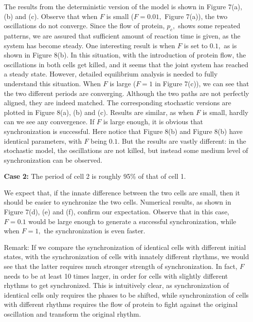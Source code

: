 \documentclass[12pt]{article}
\renewcommand{\(}{\left (}
\renewcommand{\)}{\right )}
\begin{document}
The results from the deterministic version of the model is shown in Figure 7(a), (b) and (c). Observe that when $F$ is small ($F=0.01,$ Figure 7(a)), the two oscillations do not converge. Since the flow of protein, $p_c,$ shows some repeated patterns, we are assured that sufficient amount of reaction time is given, as the system has become steady. One interesting result is when $F$ is set to $0.1,$ as is shown in Figure 8(b). In this situation, with the introduction of protein flow, the oscillations in both cells get killed, and it seems that the joint system has reached a steady state. However, detailed equilibrium analysis is needed to fully understand this situation. When $F$ is large ($F = 1$ in Figure 7(c)), we can see that the two different periods are converging. Although the two paths are not perfectly aligned, they are indeed matched. The corresponding stochastic versions are plotted in Figure 8(a), (b) and (c). Results are similar, as when $F$ is small, hardly can we see any convergence. If $F$ is large enough, it is obvious that synchronization is successful. Here notice that Figure 8(b) and Figure 8(b) have identical parameters, with $F$ being $0.1.$ But the results are vastly different: in the stochastic model, the oscillations are not killed, but instead some medium level of synchronization can be observed.



\textbf{Case 2:} The period of cell 2 is roughly 95\% of that of cell 1.

We expect that, if the innate difference between the two cells are small, then it should be easier to synchronize the two cells. Numerical results, as shown in Figure 7(d), (e) and (f), confirm our expectation. Observe that in this case, $F=0.1$ would be large enough to generate a successful synchronization, while when $F=1,$ the synchronization is even faster.

Remark: If we compare the synchronization of identical cells with different initial states, with the synchronization of cells with innately different rhythms, we would see that the latter requires much stronger strength of synchronization. In fact, $F$ needs to be at least 10 times larger, in order for cells with slightly different rhythms to get synchronized. This is intuitively clear, as synchronization of identical cells only requires the phases to be shifted, while synchronization of cells with different rhythms requires the flow of protein to fight against the original oscillation and transform the original rhythm.
\end{document}
